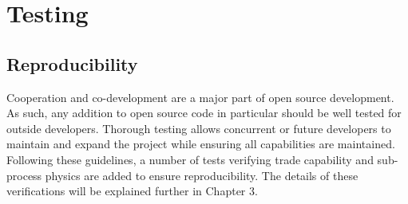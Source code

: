 \section{Testing}

\subsection{Reproducibility}
Cooperation and co-development are a major part of open source development. As such, any addition to open source code in particular should be well tested for outside developers.
Thorough testing allows concurrent or future developers to maintain and expand the project while ensuring all capabilities are maintained. Following these guidelines, a number
of tests verifying trade capability and sub-process physics are added to ensure reproducibility. The details of these verifications will be explained further in Chapter 3.